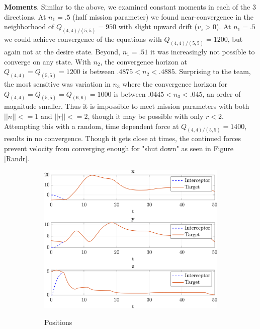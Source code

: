\documentclass{article}
\begin{document}
\begin{multicols}{2}
\textbf{Moments}.  Similar to the above, we examined constant moments in each of the 3 directions.  At $n_1=.5$ (half mission parameter) we found near-convergence in the neighborhood of $Q_{(4,4)/(5,5)}=950$ with slight upward drift ($v_z>0$).  At $n_1=.5$ we could achieve convergence of the equations with $Q_{(4,4)/(5,5)}=1200$, but again not at the desire state.  Beyond, $n_1=.51$ it was increasingly not possible to converge on any state.  With $n_2$, the convergence horizon at $Q_{(4,4)}=Q_{(5,5)}=1200$ is between $.4875<n_2<.4885$.  Surprising to the team, the most sensitive was variation in $n_3$ where the convergence horizon for $Q_{(4,4)}=Q_{(5,5)}=Q_{(6,6)}=1000$ is between $.0445<n_3<.045$, an order of magnitude smaller. Thus it is impossible to meet mission parameters with both  $||n||<=1$ and $||r||<=2$, though it may be possible with only $r<2$.  Attempting this with a random, time dependent force at $Q_{(4,4)/(5,5)}=1400$, results in no convergence.  Though it gets close at times, the continued forces prevent velocity from converging enough for "shut down" as seen in Figure \ref{Randr}.
\begin{figure}[H]
\centering
\begin{subfigure}[b]{0.49\columnwidth}
    \centering
    \includegraphics[width = 1\textwidth]{images/PosnRandom.png}
     \label{fig:PosRand}
     \vspace{-5mm}
     \caption{Positions}
\end{subfigure}
\begin{subfigure}[b]{0.49\columnwidth}
    \centering

\end{subfigure}
\end{figure}
\end{multicols}
\end{document}
